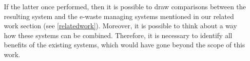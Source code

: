 If the latter once performed, then it is possible to draw comparisons between the resulting system and the e-waste managing systems mentioned in our related work section (see \ref{relatedwork}). Moreover, it is possible to think about a way how these systems can be combined. Therefore, it is necessary to identify all benefits of the existing systems, which would have gone beyond the scope of this work.